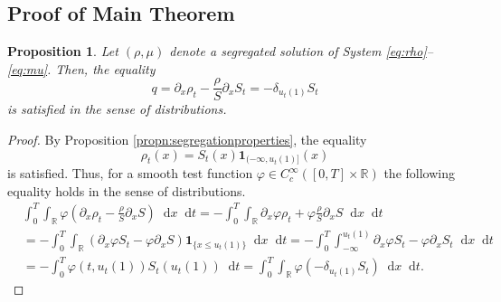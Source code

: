 \documentclass[a4paper,twosided, 11pt]{article}
\newcommand{\R}{\mathbb{R}}
\theoremstyle{plain}
\newtheorem{proposition}[thm]{Proposition}
\theoremstyle{remark}
\newcommand{\one}{\mathbf{1}}
\newcommand{\diff}{\mathop{} \mathrm{d}}
\numberwithin{equation}{section}
\begin{document}
\subsection{Proof of Main Theorem}
\begin{proposition}\label{propn:derivative} 
Let $(\rho,\mu)$ denote a segregated solution of System \eqref{eq:rho}--\eqref{eq:mu}. 
Then, the equality 
\[
q = \partial_x \rho_t - \frac{\rho}{S} \partial_x S_t = - \delta_{u_t(1)} S_t 
\]
is satisfied in the sense of distributions. 
\end{proposition}
\begin{proof}
By Proposition \ref{propn:segregationproperties}, the equality
\[
\rho_t(x) = S_t(x) \one_{(-\infty, u_t(1)]}(x) 
\]
is satisfied.
Thus, for a smooth test function $\varphi \in C_c^\infty([0,T]\times \R)$ the following equality holds in the sense of distributions.
\begin{align*}
& \int_0^T \int_\R \varphi\left (\partial_x \rho_t - \frac{\rho}{S} \partial_x S\right ) \diff x \diff t = - \int_0^T \int_\R \partial_x \varphi \rho_t + \varphi \frac{\rho}{S} \partial_x S  \diff x \diff t\\
& =  - \int_0^T \int_\R \left(\partial_x \varphi S_t - \varphi \partial_x S\right)\one_{\{ x\leq u_t(1)\}}   \diff x \diff t 
 =  - \int_0^T \int_{-\infty}^{u_t(1)} \partial_x \varphi S_t - \varphi \partial_x S_t  \diff x \diff t\\
 & = - \int_0^T \varphi(t,u_t(1))S_t(u_t(1)) \diff t = \int_0^T \int_\R \varphi \left(- \delta_{u_t(1)} S_t\right) \diff x \diff t . 
\end{align*}
\end{proof}
\end{document}

